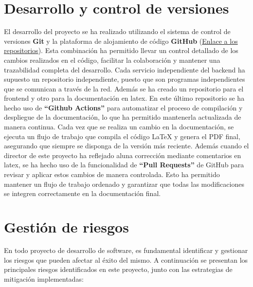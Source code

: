 \section{Desarrollo y control de versiones}

El desarrollo del proyecto se ha realizado utilizando el sistema de control de versiones \textbf{Git} y la plataforma de alojamiento de código \textbf{GitHub} (\href{https://github.com/TempusUGR}{Enlace a los repositorios}). Esta combinación ha permitido llevar un control detallado de los cambios realizados en el código, facilitar la colaboración y mantener una trazabilidad completa del desarrollo.
\newline\newline
Cada servicio independiente del backend ha supuesto un repositorio independiente, puesto que son programas independientes que se comunican a través de la red. Además se ha creado un repositorio para el frontend y otro para la documentación en latex.
\newline\newline
En este último repositorio se ha hecho uso de \textbf{``Github Actions''} para automatizar el proceso de compilación y despliegue de la documentación, lo que ha permitido mantenerla actualizada de manera continua. Cada vez que se realiza un cambio en la documentación, se ejecuta un flujo de trabajo que compila el código LaTeX y genera el PDF final, asegurando que siempre se disponga de la versión más reciente.
\newline
Además cuando el director de este proyecto ha reflejado aluna corrección mediante comentarios en latex, se ha hecho uso de la funcionalidad de \textbf{``Pull Requests''} de GitHub para revisar y aplicar estos cambios de manera controlada. Esto ha permitido mantener un flujo de trabajo ordenado y garantizar que todas las modificaciones se integren correctamente en la documentación final.

\section{Gestión de riesgos}

En todo proyecto de desarrollo de software, es fundamental identificar y gestionar los riesgos que pueden afectar al éxito del mismo. A continuación se presentan los principales riesgos identificados en este proyecto, junto con las estrategias de mitigación implementadas:

